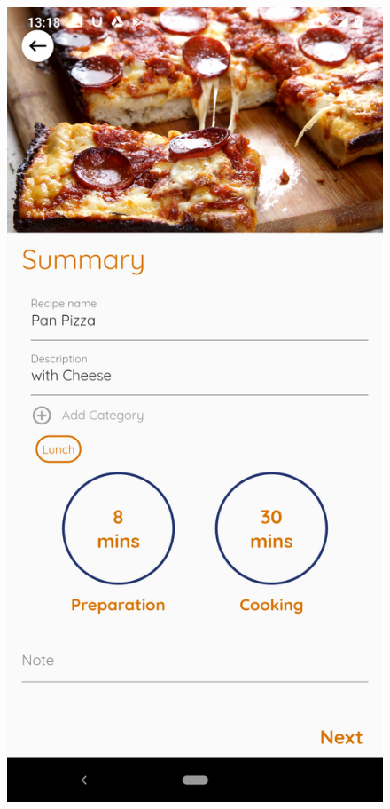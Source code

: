 \documentclass{article}
\begin{document}
\begin{figure}[h!]
    \includegraphics[scale=0.1]{Images/Panpizza_order.jpg}

\end{figure}
\end{document}
